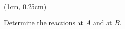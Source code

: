 \documentclass[9pt, xcolor={svgnames, x11names},professionalfonts]{beamer}
\def\scale{1}
\begin{document}
\begin{frame}
	\begin{textblock*}{1\textwidth}(1cm, 0.25cm)

		\begin{myexam}{}{}
			\centering
			\def\scale{0.55}
			
			\parb
			Determine the reactions at $A$ and at $B$.
		\end{myexam}
	\end{textblock*}

\end{frame}


% 				
\end{document}
